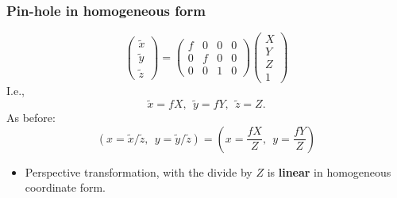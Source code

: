 \begin{frame}
\frametitle{Pin-hole in homogeneous form}
\[
\left (
\begin{array}{c}
\tilde{x}\\
\tilde{y}\\
\tilde{z}
\end{array}
\right )
=
\left (
\begin{array}{cccc}
f & 0 & 0 & 0 \\
0 & f & 0 & 0 \\
0 & 0 & 1 & 0
\end{array}
\right )
\left (
\begin{array}{c}
X \\
Y \\
Z \\
1
\end{array}
\right )
\]
I.e.,
\[
\tilde{x} = fX,\ \ \tilde{y} = fY,\ \ \tilde{z} = Z.
\]
As before:
\[
\left ( x = \tilde{x}/\tilde{z},\ \ y = \tilde{y}/\tilde{z}\right ) = \left ( x = \dfrac{fX}{Z},\ \ y = \dfrac{fY}{Z}\right )
\]
\begin{itemize}
\item Perspective transformation, with the divide by $Z$ is \textbf{linear} in homogeneous coordinate form.
\end{itemize}
\end{frame}

